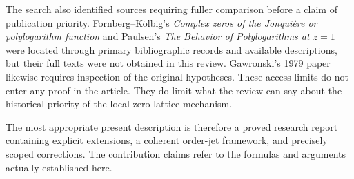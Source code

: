 \documentclass[11pt,a4paper]{article}
\numberwithin{equation}{section}
\theoremstyle{definition}
\theoremstyle{remark}
\begin{document}
The search also identified sources requiring fuller comparison before
a claim of publication priority. Fornberg--K\"olbig's
\emph{Complex zeros of the Jonquière or polylogarithm function}
\cite{fornberg-kolbig} and Paulsen's \emph{The Behavior of
Polylogarithms at $z=1$} \cite{paulsen} were located through primary
bibliographic records and available descriptions, but their full texts
were not obtained in this review. Gawronski's 1979 paper
\cite{gawronski} likewise requires inspection of the original
hypotheses. These access limits do not enter any proof in the article.
They do limit what the review can say about the historical priority of
the local zero-lattice mechanism.

The most appropriate present description is therefore a proved
research report containing explicit extensions, a coherent order-jet
framework, and precisely scoped corrections. The contribution claims
refer to the formulas and arguments actually established here.
\end{document}
